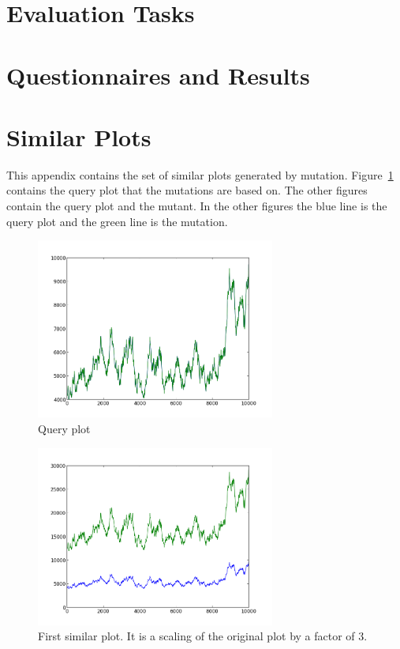 \section{Evaluation Tasks}
\label{sec:tasks}

\section{Questionnaires and Results}
\label{sec:qs}

\section{Similar Plots}
\label{sec:mutants}

This appendix contains the set of similar plots generated by mutation.  Figure~\ref{fig:query} contains the query plot that the mutations are based on.  The other figures contain the query plot and the mutant.  In the other figures the blue line is the query plot and the green line is the mutation.

\begin{figure}[h!]
    \centering
    \includegraphics[width=0.7\textwidth]{images/query.png}
    \caption{Query plot}
    \label{fig:query}
\end{figure}

\begin{figure}[h!]
    \centering
    \includegraphics[width=0.7\textwidth]{images/mutant_1.png}
    \caption{First similar plot.  It is a scaling of the original plot by a factor of 3.}
    \label{fig:mutant_1}
\end{figure}

